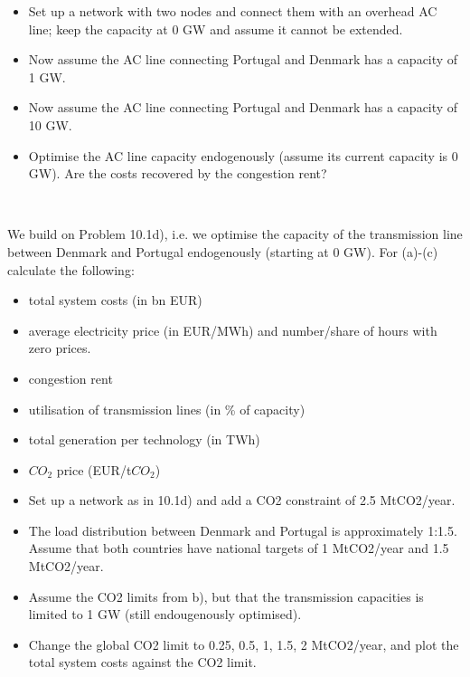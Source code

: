 \documentclass[10pt]{article}
\newenvironment{problem}[2][Problem]{\begin{trivlist}
\item[\hskip \labelsep {\bfseries #1}\hskip \labelsep {\bfseries #2.}]}{\end{trivlist}}
\begin{document}
\begin{problem}{10.1}
\begin{itemize}
	\item[a)] Set up a network with two nodes and connect them with an overhead AC line; keep the capacity at 0 GW and assume it cannot be extended.
	\item[b)] Now assume the AC line connecting Portugal and Denmark has a capacity of 1 GW.
	\item[c)] Now assume the AC line connecting Portugal and Denmark has a capacity of 10 GW.
	\item[d)] Optimise the AC line capacity endogenously (assume its current capacity is 0 GW). Are the costs recovered by the congestion rent?
\end{itemize}


\end{problem}

\

\begin{problem}{10.2}
We build on Problem 10.1d), i.e. we optimise the capacity of the transmission line between Denmark and Portugal endogenously (starting at 0 GW). For (a)-(c) calculate the following:
\begin{itemize}
	\item total system costs (in bn EUR)
	\item average electricity price (in EUR/MWh) and number/share of hours with zero prices.
	\item congestion rent 
	\item utilisation of transmission lines (in \% of capacity)
	\item total generation per technology (in TWh)
	\item $CO_2$ price (EUR/t$CO_2$)
\end{itemize}




\begin{itemize}
	\item[a)] Set up a network as in 10.1d) and add a CO2 constraint of 2.5 MtCO2/year.
	\item[b)] The load distribution between Denmark and Portugal is approximately 1:1.5. Assume that both countries have national targets of 1 MtCO2/year and 1.5 MtCO2/year.
	\item[c)] Assume the CO2 limits from b), but that the transmission capacities is limited to 1 GW (still endougenously optimised).
	\item[d)] Change the global CO2 limit to 0.25, 0.5, 1, 1.5, 2 MtCO2/year, and plot the total system costs against the CO2 limit.
	
\end{itemize}

\end{problem}

\




\end{document}

